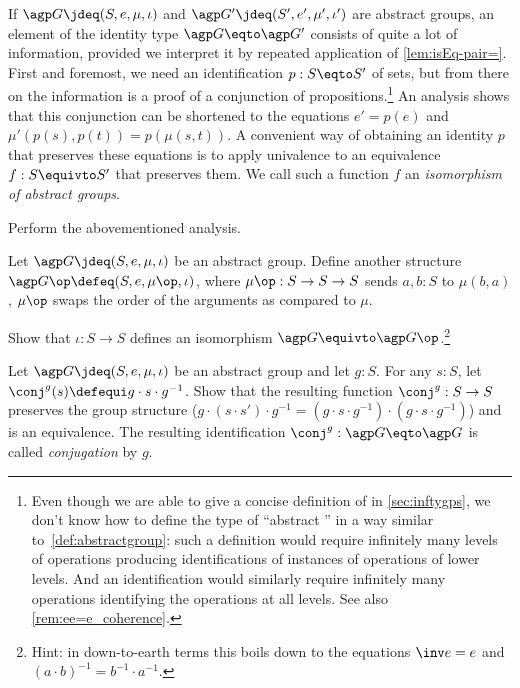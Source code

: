 \begin{remark}\label{rem:abs-iso}
  If $\agp G\jdeq (S,e,\mu,\iota)$ and $\agp G'\jdeq(S',e',\mu',\iota')$
  are abstract groups, an element of the identity type
  $\agp G\eqto\agp G'$ consists of quite a lot of information,
  provided we interpret it by repeated application of \cref{lem:isEq-pair=}.
  First and foremost, we need an identification $p:S\eqto S'$ of sets, but
  from there on the information is a proof of a conjunction of propositions.\footnote{%
    \label{ft:no-abs-inftygp}
    Even though we are able to give a concise definition of \inftygps 
    in \cref{sec:inftygps}, we don't know how to define
    the type of ``abstract \inftygps'' in a way similar
    to~\cref{def:abstractgroup}:
    such a definition would require infinitely many 
    levels of operations producing
    identifications of instances of operations of lower levels.
    And an identification would similarly require infinitely
    many operations identifying the operations at all levels.
    See also \cref{rem:ee=e_coherence}.}
  An analysis shows that this conjunction can be shortened to the equations $e'=p(e)$ and
  $\mu'(p(s),p(t))=p(\mu(s,t))$.  A convenient way of obtaining an 
  identity $p$ that preserves these equations is to apply univalence to an
  equivalence $f: S \equivto S'$ that preserves them.
  We call such a function $f$ an \emph{isomorphism of abstract groups}.%
\end{remark}

\begin{xca}
  Perform the abovementioned analysis.
\end{xca}

\begin{xca}
  \label{xca:op-abs-group}
  Let $\agp G \jdeq (S,e,\mu,\iota)$ be an abstract group.
  Define another structure $\agp G\op \defeq (S,e,\mu\op,\iota)$,
  where $\mu\op : S \to S \to S$ sends $a,b:S$ to $\mu(b,a)$,
  \ie $\mu\op$ swaps the order of the arguments as compared to $\mu$.

  Show that $\iota : S \to S$ defines an isomorphism 
  $\agp G \equivto \agp G\op$.\footnote{%
  Hint: in down-to-earth terms this boils down to the equations
  $\inv e = e$ and $(a\cdot b)^{-1} = b^{-1}\cdot a^{-1}$.}
\end{xca}

\begin{xca}
  \label{xca:conj}
  Let $\agp G\jdeq(S,e,\mu,\iota)$ be an abstract group and let $g:S$.  
  For any $s:S$, let $\conj^g(s)\defequi g\cdot s\cdot g^{-1}$. 
  Show that the resulting function $\conj^g:S\to S$ preserves the group 
  structure (\eg $g\cdot(s\cdot s')\cdot g^{-1}=(g\cdot s\cdot g^{-1} )\cdot(g\cdot s\cdot g^{-1})$) and is an equivalence.  The resulting identification $\conj^g:\agp G\eqto\agp G$ is called \emph{conjugation} by $g$.
\end{xca}

